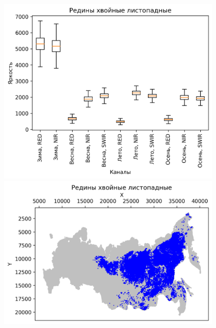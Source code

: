 \documentclass[14pt, a4paper, oneside]{extarticle}
\begin{document}
\begin{figure}[H]
    \centering
    \includegraphics[]{class-23-boxplot}
    \includegraphics[]{class-23-map}
\end{figure}
\end{document}
